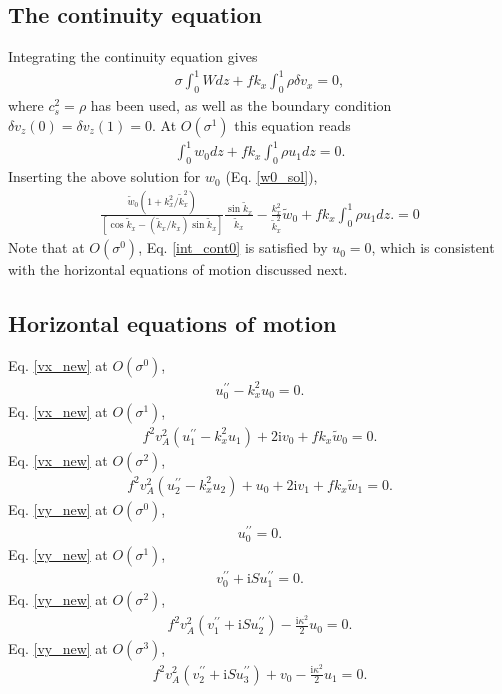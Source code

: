 \documentclass[12pt,preprint]{aastex}
\newcommand{\imgi}{\mathrm{i}}
\newcommand{\dd}{\delta}
\newcommand{\dvx}{\dd v_x}
\newcommand{\dvz}{\dd v_z}
\begin{document}
\subsection{The continuity equation} 
Integrating the continuity equation gives
\begin{align}
  \sigma \int_0^1 W dz + f k_x \int_0^1\rho \dvx = 0,  \label{int_cont0}
\end{align}
where $c_s^2 = \rho$ has been used, as well as the boundary condition
$\dvz(0)=\dvz(1)=0$. At $O(\sigma^1)$ this equation reads
\begin{align}
  \int_0^1w_0 dz + f k_x \int_0^1\rho u_1 dz = 0.
\end{align}
Inserting the above solution for $w_0$ (Eq. \ref{w0_sol}), 
\begin{align}
   \frac{\tilde{w}_0\left(1 +
    k_x^2/\tilde{k}_x^2\right)}{\left[\cos{\tilde{k}_x} -
    \left(\tilde{k}_x/k_x\right)\sin{\tilde{k}_x}\right]}\frac{\sin{\tilde{k}_x}}{\tilde{k}_x} -
  \frac{k_x^2}{\tilde{k}_x^2}\tilde{w}_0 + fk_x \int_0^1\rho u_1 dz.
  =0 \label{int_cont} 
\end{align}
Note that at $O(\sigma^0)$, Eq. \ref{int_cont0} is satisfied by
$u_0=0$, which is consistent with the horizontal equations of motion
discussed next. 


\subsection{Horizontal equations of motion}
\noindent Eq. \ref{vx_new} at $O(\sigma^0)$,
\begin{align}
  u_0^{\prime\prime} - k_x^2u_0 = 0.
\end{align}
Eq. \ref{vx_new} at $O(\sigma^1)$,
\begin{align}
  f^2v_A^2\left(u_1^{\prime\prime} - k_x^2u_1\right)  + 2 \imgi v_0 +
  f k_x \tilde{w}_0= 0. \label{vx_o1} 
\end{align}
Eq. \ref{vx_new} at $O(\sigma^2)$,
\begin{align}
  f^2v_A^2\left(u_2^{\prime\prime} - k_x^2u_2\right)  + u_0 + 2 \imgi v_1 +
  f k_x \tilde{w}_1= 0.   
\end{align}
Eq. \ref{vy_new} at $O(\sigma^0)$,
\begin{align}
  u_0^{\prime\prime} = 0.
\end{align}
Eq. \ref{vy_new} at $O(\sigma^1)$,
\begin{align}
  v_0^{\prime\prime} + \imgi S u_1^{\prime\prime} = 0.\label{v0pp}
\end{align}
Eq. \ref{vy_new} at $O(\sigma^2)$,
\begin{align}
  f^2v_A^2\left(v_1^{\prime\prime} + \imgi S u_2^{\prime\prime}\right)
  - \frac{\imgi\kappa^2}{2}u_0= 0.  
\end{align}
Eq. \ref{vy_new} at $O(\sigma^3)$,
\begin{align}
  f^2v_A^2\left(v_2^{\prime\prime} + \imgi S u_3^{\prime\prime}\right)
  + v_0 - \frac{\imgi\kappa^2}{2}u_1= 0.  \label{vy_o3} 
\end{align}
\end{document}
